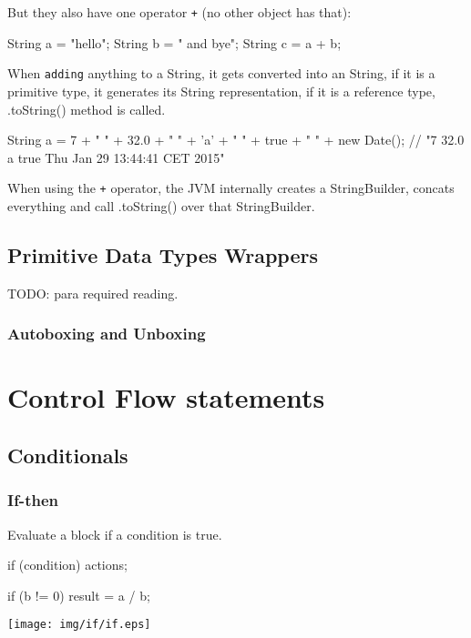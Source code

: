 \documentclass[a4paper, 9pt]{extarticle}
\begin{document}
\begin{itemize}
  But they also have one operator \verb'+' (no other object has that):

\begin{blackboard}
String a = "hello";
String b = " and bye";
String c = a + b;
\end{blackboard}

  When \verb+adding+ anything to a String, it gets converted into an String, if
  it is a primitive type, it generates its String representation, if it is a
  reference type, .toString() method is called.

\begin{blackboard}
String a = 7 + " " + 32.0 + " " + 'a' + " " + true + " " + new Date();
// "7 32.0 a true Thu Jan 29 13:44:41 CET 2015"
\end{blackboard}

When using the \verb.+. operator, the JVM internally creates a StringBuilder,
concats everything and call .toString() over that StringBuilder.

\end{itemize}



\subsection{Primitive Data Types Wrappers}

TODO: para required reading.

\subsubsection{Autoboxing and Unboxing}

\section{Control Flow statements}

\subsection{Conditionals}

\subsubsection{If-then}

Evaluate a block if a condition is true.

\begin{multicols}{2}
\begin{blackboard}
        if (condition) {
            actions;
        }

if (b != 0) {
    result = a / b;
}
\end{blackboard}

\columnbreak

  \begin{center}
    \texttt{[image: img/if/if.eps]}
  \end{center}
\end{multicols}
\end{document}
